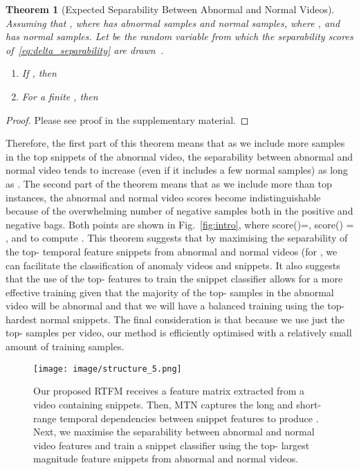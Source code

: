 \documentclass[10pt,twocolumn,letterpaper]{article}
\newtheorem{theorem}{Theorem}[section]
\begin{document}
\begin{theorem}[Expected Separability Between Abnormal and Normal  Videos]
\label{thm:expected_separability}
Assuming that , where  has  abnormal samples and  normal samples, where , and  has  normal samples.
Let  be the random variable from which the separability scores  of~\eqref{eq:delta_separability} are drawn~\cite{li2015multiple}.
\begin{enumerate}
    \item If  , then
    
    \item For a finite , then
    
\end{enumerate}
\end{theorem}
\begin{proof}
    Please see proof in the supplementary material.
\end{proof}
Therefore, the first part of this theorem means that as we include more samples in the top  snippets of the abnormal video, 
the separability between abnormal and normal video tends to increase (even if it includes a few normal samples) as long as .  
The second part of the theorem means that as we include more than  top instances, the abnormal and normal video scores become indistinguishable because of the overwhelming number of negative samples both in the positive and negative bags.  
Both points are shown in Fig.~\ref{fig:intro}, where score()=, score() = , and  to compute . This theorem suggests that by maximising the separability of the top- temporal feature snippets from abnormal and normal videos (for , we can facilitate the classification of anomaly videos and snippets.  It also suggests that the use of the top- features to train the snippet classifier allows for a more effective training given that the majority of the top- samples in the abnormal video will be abnormal and that we will have a balanced training using the top- hardest normal snippets. The final consideration is that because we use just the top- samples per video, our method is efficiently optimised with a relatively small amount of training samples. 

\begin{figure}
\begin{center}
\texttt{[image: image/structure\_5.png]}
\end{center}
  \caption{Our proposed RTFM receives a  feature matrix  extracted from a video containing  snippets. Then, MTN captures the long and short-range temporal dependencies between snippet features to produce . Next, we maximise the separability between abnormal and normal video features and train a snippet classifier using the top- largest magnitude feature snippets from abnormal and normal videos. 
}
\label{fig:framework}
\end{figure}
\end{document}
